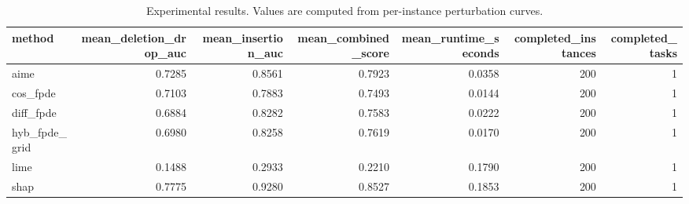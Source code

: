 \begin{table}[t]
\caption{Experimental results. Values are computed from per-instance perturbation curves.}
\label{tab:main_results_computed}
\centering
\begin{tabular}{lrrrrrr}
\toprule
method & mean\_deletion\_drop\_auc & mean\_insertion\_auc & mean\_combined\_score & mean\_runtime\_seconds & completed\_instances & completed\_tasks \\
\midrule
aime & 0.7285 & 0.8561 & 0.7923 & 0.0358 & 200 & 1 \\
cos\_fpde & 0.7103 & 0.7883 & 0.7493 & 0.0144 & 200 & 1 \\
diff\_fpde & 0.6884 & 0.8282 & 0.7583 & 0.0222 & 200 & 1 \\
hyb\_fpde\_grid & 0.6980 & 0.8258 & 0.7619 & 0.0170 & 200 & 1 \\
lime & 0.1488 & 0.2933 & 0.2210 & 0.1790 & 200 & 1 \\
shap & 0.7775 & 0.9280 & 0.8527 & 0.1853 & 200 & 1 \\
\bottomrule
\end{tabular}

\end{table}
